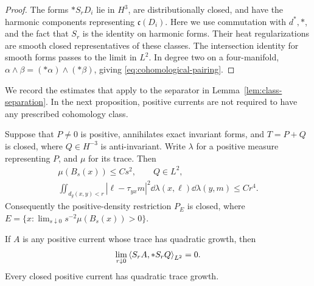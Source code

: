 \begin{proof}
The forms \(*S_rD_i\) lie in \(H^3\), are distributionally closed,
and have the harmonic components representing \(\mathfrak c(D_i)\).
Here we use commutation with \(d^*,*\), and the fact that \(S_r\)
is the identity on harmonic forms. Their heat regularizations are
smooth closed representatives of these classes. The intersection
identity for smooth forms passes to the limit in \(L^2\).
In degree two on a four-manifold,
\(\alpha\wedge\beta=(*\alpha)\wedge(*\beta)\), giving
\eqref{eq:cohomological-pairing}.
\end{proof}

We record the estimates that apply to the separator in
Lemma~\ref{lem:class-separation}. In the next proposition, positive
currents are not required to have any prescribed cohomology class.

\begin{proposition}\label{prop:class-estimates}
Suppose that \(P\ne0\) is positive, annihilates exact invariant
forms, and \(T=P+Q\) is closed, where \(Q\in H^{-3}\) is
anti-invariant. Write \(\lambda\) for a positive measure representing
\(P\), and \(\mu\) for its trace. Then
\begin{gather}
 \mu(B_s(x))\le Cs^2,\qquad Q\in L^2,
 \label{eq:class-growth}\\
 \iint_{d_g(x,y)<r}|\ell-\tau_{yx}m|^2
       \dd\lambda(x,\ell)\dd\lambda(y,m)\le Cr^4.
 \label{eq:class-angular}
\end{gather}
Consequently the positive-density restriction \(P_E\) is closed,
where \(E=\{x:\lim_{s\downarrow0}s^{-2}\mu(B_s(x))>0\}\).

If \(A\) is any positive current whose trace has quadratic growth,
then
\begin{equation}\label{eq:class-mixed-limit}
 \lim_{r\downarrow0}\left\langle S_rA,*S_rQ\right\rangle_{L^2}=0.
\end{equation}
Every closed positive current has quadratic trace growth.
\end{proposition}


